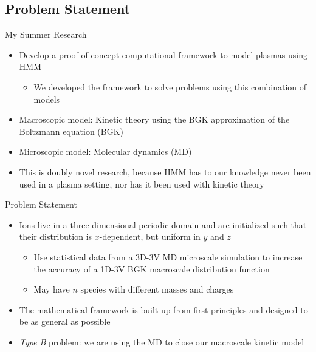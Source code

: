 \documentclass{beamer}
\begin{document}
	\subsection{Problem Statement}
	\begin{frame}{My Summer Research}
		\begin{itemize}
			\item  Develop a proof-of-concept computational framework to model plasmas using HMM\vspace{1em}
			\begin{itemize}
			\item  We developed the framework to solve problems using this combination of models\vspace{1em}
			\end{itemize}
			\item  Macroscopic model: Kinetic theory using the BGK approximation of the Boltzmann equation (BGK)\vspace{1em}
			\item  Microscopic model: Molecular dynamics (MD)\vspace{1em}
			\item This is doubly novel research, because HMM has to our knowledge never been used in a plasma setting, nor has it been used with kinetic theory
		\end{itemize}
	\end{frame}
	
	\begin{frame}{Problem Statement}
		\begin{itemize}
			\item  Ions live in a three-dimensional periodic domain and are initialized such that their distribution is $x$-dependent, but uniform in $y$ and $z$
			\vspace{0.5em}
			\begin{itemize}
				\item Use statistical data from a 3D-3V MD microscale simulation to increase the accuracy of a 1D-3V BGK macroscale distribution function
				\vspace{0.5em}
				\item  May have $n$ species with different masses and charges
				\vspace{0.5em}
			\end{itemize}
			\vspace{0.5em}
			\item  The mathematical framework is built up from first principles and designed to be as general as possible
			\vspace{0.5em}
			\item  \emph{Type B} problem: we are using the MD to close our macroscale kinetic model
		\end{itemize}
	\end{frame}
	
\end{document}

